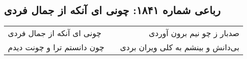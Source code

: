 \begin{center}
\section*{رباعی شماره ۱۸۴۱: چونی ای آنکه از جمال فردی}
\label{sec:1841}
\begin{longtable}{l p{0.5cm} r}
چونی ای آنکه از جمال فردی
&&
صدبار ز چو نیم برون آوردی
\\
چون دانستم ترا و چونت دیدم
&&
بی‌دانش و بینشم به کلی ویران بردی
\\
\end{longtable}
\end{center}
